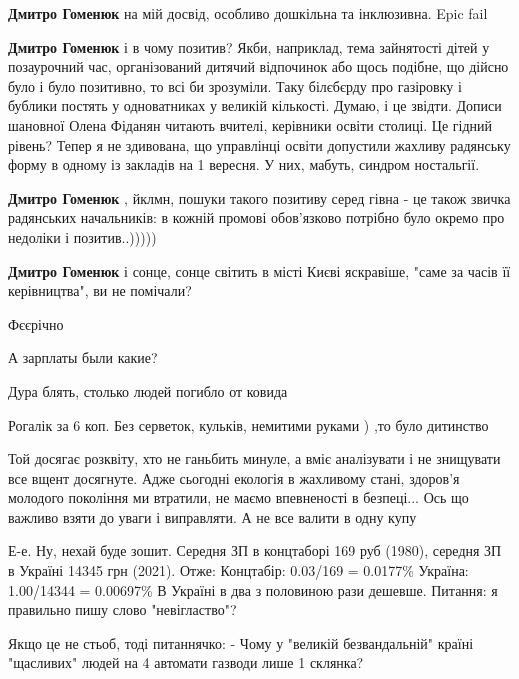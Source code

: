 \begin{itemize}
\begin{itemize} %
\textbf{Дмитро Гоменюк} на мій досвід, особливо дошкільна та інклюзивна. Epic fail

\textbf{Дмитро Гоменюк} і в чому позитив? Якби, наприклад, тема зайнятості дітей у позаурочний час, організований дитячий відпочинок або щось подібне, що дійсно було і було позитивно, то всі би зрозуміли. Таку білєбєрду про газіровку і бублики постять у одноватниках у великій кількості. Думаю, і це звідти. Дописи шановної Олена Фіданян читають вчителі, керівники освіти столиці. Це гідний рівень? Тепер я не здивована, що управлінці освіти допустили жахливу радянську форму в одному із закладів на 1 вересня. У них, мабуть, синдром ностальгії.

\textbf{Дмитро Гоменюк} , йклмн, пошуки такого позитиву серед гівна - це також звичка радянських начальників: в кожній промові обов'язково потрібно було окремо про недоліки і позитив..)))))

\textbf{Дмитро Гоменюк} і сонце, сонце світить в місті Києві яскравіше, "саме за часів її керівництва", ви не помічали?
\end{itemize} %

Фєєрічно

А зарплаты были какие?

Дура блять, столько людей погибло от ковида

Рогалік за 6 коп. Без серветок, кульків, немитими руками ) ,то було дитинство


Той досягає розквіту, хто не ганьбить минуле, а вміє аналізувати і не знищувати
все вщент досягнуте. Адже сьогодні екологія в жахливому стані, здоров'я
молодого покоління ми втратили, не маємо впевненості в безпеці... Ось що
важливо взяти до уваги і виправляти. А не все валити в одну купу


\obeycr
Е-е. Ну, нехай буде зошит. Середня ЗП в концтаборі 169 руб (1980), середня ЗП в Україні 14345 грн (2021). Отже:
Концтабір: 0.03/169 = 0.0177\%
Україна: 1.00/14344 = 0.00697\%
В Україні в два з половиною рази дешевше. Питання: я правильно пишу слово "невігластво"?
\restorecr

Якщо це не стьоб, тоді питаннячко:
- Чому у "великій безвандальній" країні "щасливих" людей на 4 автомати газводи лише 1 склянка?


\end{itemize}
